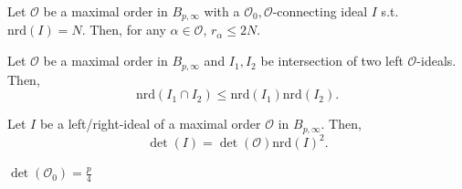 \begin{lemma}
\label{lem:denombound}
Let $\mathcal{O}$ be a maximal order in $B_{p,\infty}$ with a $\mathcal{O}_0,\mathcal{O}$-connecting ideal $I$ s.t. $\mathrm{nrd}(I) = N$. Then, for any $\alpha \in \mathcal{O}$, $r_{\alpha} \leq 2N$.
\end{lemma}

\begin{lemma}
\label{lem:normintersection}
Let $\mathcal{O}$ be a maximal order in $B_{p,\infty}$ and $I_1,I_2$ be intersection of two left $\mathcal{O}$-ideals. Then,
\[ \mathrm{nrd}(I_1 \cap I_2) \leq \mathrm{nrd}(I_1)\mathrm{nrd}(I_2). \]
\end{lemma}

\begin{lemma}
\label{lem:detnrd}
Let $I$ be a left/right-ideal of a maximal order $\mathcal{O}$ in $B_{p,\infty}$. Then,
\[ \det(I) = \det(\mathcal{O})\mathrm{nrd}(I)^2. \]
\end{lemma}

\begin{lemma}
\label{lem:detO0}
$\det(\mathcal{O}_0) = \frac{p}{4}$
\end{lemma}




